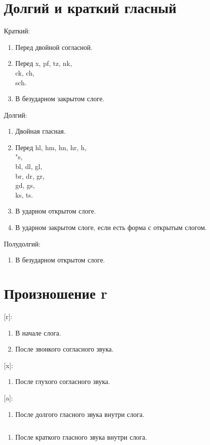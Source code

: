\documentclass[oneside]{book}
\begin{document}
	\section{Долгий и краткий гласный}
	Краткий:
	\begin{enumerate}
		\item Перед двойной согласной.

		\item Перед x, pf, tz, nk, \\
		ck, ch, \\
		sch.

		\item В безударном закрытом слоге.
	\end{enumerate}

	Долгий:
	\begin{enumerate}
		\item Двойная гласная.

		\item Перед hl, hm, hn, hr, h, \\
		"s, \\
		bl, dl, gl, \\
		br, dr, gr, \\
		gd, gs, \\
		ks, ts.

		\item В ударном открытом слоге.

		\item В ударном закрытом слоге, если
		есть форма с открытым слогом.
	\end{enumerate}

	Полудолгий:
	\begin{enumerate}
		\item В безударном открытом слоге.
	\end{enumerate}

	\section{Произношение r}
	[r]:
	\begin{enumerate}
		\item В начале слога.
		\item После звонкого согласного звука.
	\end{enumerate}

	[x]:
	\begin{enumerate}
		\item После глухого согласного звука.
	\end{enumerate}

	[a]:
	\begin{enumerate}
		\item После долгого гласного звука внутри слога.
	\end{enumerate}

	\begin{math}
		[\mu]
	\end{math}
	\begin{enumerate}
		\item После краткого гласного звука внутри слога.
	\end{enumerate}
\end{document}
